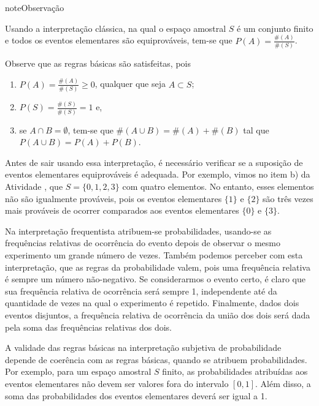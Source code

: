 \begin{sphinxadmonition}{note}{Observação}

 Usando a interpretação clássica, na qual o espaço amostral \(S\) é um conjunto finito e todos os eventos elementares são equiprováveis, tem-se que \(P(A)=\frac{\#(A)}{\#(S)}\).

Observe que as regras básicas são satisfeitas, pois
\begin{enumerate}
\item {} 
\(P(A)=\frac{\#(A)}{\#(S)}\geq 0\), qualquer que seja \(A \subset S\);

\item {} 
\(P(S)=\frac{\#(S)}{\#(S)}=1\) e,

\item {} 
se \(A\cap B=\emptyset\), tem-se que \(\#(A\cup B)=\#(A)+\#(B)\) tal que \(P(A\cup B)=P(A)+P(B)\).

\end{enumerate}

 Antes de sair usando essa interpretação, é necessário verificar se a suposição de eventos elementares equiprováveis é adequada. Por exemplo, vimos no item b) da Atividade , que \(S=\{0,1,2,3\}\) com quatro elementos. No entanto, esses elementos não são igualmente prováveis, pois os eventos elementares \(\{1\}\) e \(\{ 2\}\) são três vezes mais prováveis de ocorrer comparados aos eventos elementares \(\{0\}\) e \(\{3\}\).
\end{sphinxadmonition}


Na interpretação frequentista atribuem-se probabilidades, usando-se as frequências relativas de ocorrência do evento depois de observar o mesmo experimento um grande número de vezes. Também podemos perceber com esta interpretação, que as regras da probabilidade valem, pois uma frequência relativa é sempre um número não-negativo. Se considerarmos o evento certo, é claro que sua frequência relativa de ocorrência será sempre 1, independente até da quantidade de vezes na qual o experimento é repetido. Finalmente, dados dois eventos disjuntos, a frequência relativa de ocorrência da união dos dois será dada pela soma das frequências relativas dos dois.


A validade das regras básicas na interpretação subjetiva de probabilidade depende de coerência com as regras básicas, quando se atribuem probabilidades. Por exemplo, para um espaço amostral \(S\) finito, as probabilidades atribuídas aos eventos elementares não devem ser valores fora do intervalo \([0,1]\). Além disso, a soma das probabilidades dos eventos elementares deverá ser igual a 1.



